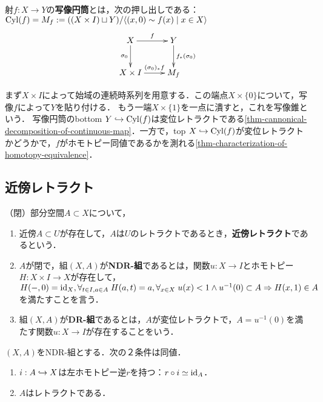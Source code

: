\documentclass[uplatex,dvipdfmx]{jsreport}
\begin{document}
\begin{definition}
    射$f:X\to Y$の\textbf{写像円筒}とは，次の押し出しである：$\mathrm{Cyl}(f)=M_f:=((X\times I)\sqcup Y)/\langle(x,0)\sim f(x)\mid x\in X\rangle$
    \[\xymatrix{
        X\ar[r]^-f\ar[d]_-{\sigma_0}&Y\ar[d]^-{f_*(\sigma_0)}\\
        X\times I\ar[r]^-{(\sigma_0)_*f}&M_f
    }\]
\end{definition}
\begin{remarks}
    まず$X\times I$によって始域の連続時系列を用意する．この端点$X\times\{0\}$について，写像$f$によって$Y$を貼り付ける．
    もう一端$X\times\{1\}$を一点に潰すと，これを写像錐という．
    写像円筒のbottom $Y\hookrightarrow\mathrm{Cyl}(f)$は変位レトラクトである\ref{thm-cannonical-decomposition-of-continuous-map}．一方で，top $X\hookrightarrow\mathrm{Cyl}(f)$が変位レトラクトかどうかで，$f$がホモトピー同値であるかを測れる\ref{thm-characterization-of-homotopy-equivalence}．
\end{remarks}

\subsection{近傍レトラクト}

\begin{definition}
    （閉）部分空間$A\subset X$について，
    \begin{enumerate}
        \item 近傍$A\subset U$が存在して，$A$は$U$のレトラクトであるとき，\textbf{近傍レトラクト}であるという．
        \item $A$が閉で，組$(X,A)$が\textbf{NDR-組}であるとは，関数$u:X\to I$とホモトピー$H:X\times I\to X$が存在して，$H(-,0)=\mathrm{id}_X,\forall_{t\in I,a\in A}\;H(a,t)=a,\forall_{x\in X}\;u(x)<1\land u^{-1}(0)\subset A\Rightarrow H(x,1)\in A$を満たすことを言う．
        \item 組$(X,A)$が\textbf{DR-組}であるとは，$A$が変位レトラクトで，$A=u^{-1}(0)$を満たす関数$u:X\to I$が存在することをいう．
    \end{enumerate}
\end{definition}

\begin{lemma}
    $(X,A)$をNDR-組とする．次の２条件は同値．
    \begin{enumerate}
        \item $i:A\hookrightarrow X$は左ホモトピー逆$r$を持つ：$r\circ i\simeq\mathrm{id}_A$．
        \item $A$はレトラクトである．
    \end{enumerate}
\end{lemma}
\end{document}

